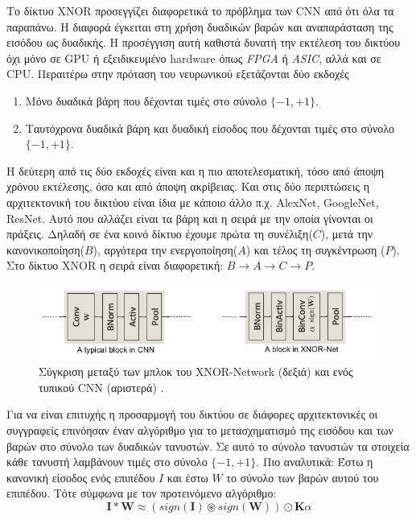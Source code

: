 Το δίκτυο XNOR προσεγγίζει διαφορετικά το πρόβλημα των CNN από ότι όλα τα παραπάνω. Η διαφορά έγκειται στη χρήση δυαδικών βαρών και αναπαράσταση της εισόδου ως δυαδικής. Η προσέγγιση αυτή καθιστά δυνατή την εκτέλεση του δικτύου όχι μόνο σε GPU ή εξειδικευμένο hardware όπως \textit{FPGA} ή \textit{ASIC}, αλλά και σε CPU. Περαιτέρω στην πρόταση του νευρωνικού εξετάζονται δύο εκδοχές
\begin{enumerate}
  \item Μόνο δυαδικά βάρη που δέχονται τιμές στο σύνολο $\{-1, +1\}$.
  \item Ταυτόχρονα δυαδικά βάρη και δυαδική είσοδος που δέχονται τιμές στο σύνολο $\{-1, +1\}$.
\end{enumerate}
Η δεύτερη από τις δύο εκδοχές είναι και η πιο αποτελεσματική, τόσο από άποψη χρόνου εκτέλεσης, όσο και από άποψη ακρίβειας. Και στις δύο περιπτώσεις η αρχιτεκτονική του δικτύου είναι ίδια με κάποιο άλλο π.χ. AlexNet\cite{20}, GoogleNet\cite{17}, ResNet\cite{21}. Αυτό που αλλάζει είναι τα βάρη και η σειρά με την οποία γίνονται οι πράξεις. Δηλαδή σε ένα κοινό δίκτυο έχουμε πρώτα τη συνέλιξη($C$), μετά την κανονικοποίηση($B$), αργότερα την ενεργοποίηση($A$) και τέλος τη συγκέντρωση ($P$). Στο δίκτυο XNOR η σειρά είναι διαφορετική: $B\rightarrow A\rightarrow C\rightarrow P$.

\begin{figure}
\centering
\includegraphics[width = \textwidth]{figures/XNOR_Net/XNOR_NET_block.png}
\caption[XNOR block vs typical CNN block]{Σύγκριση μεταξύ των μπλοκ του XNOR-Network (δεξιά) και ενός τυπικού CNN (αριστερά) \cite{18}.}
\label{fig:XNOR_NET_block}
\end{figure}

Για να είναι επιτυχής η προσαρμογή του δικτύου σε διάφορες αρχιτεκτονικές οι συγγραφείς επινόησαν έναν αλγόριθμο για το μετασχηματισμό της εισόδου και των βαρών στο σύνολο των δυαδικών τανυστών. Σε αυτό το σύνολο τανυστών τα στοιχεία κάθε τανυστή λαμβάνουν τιμές στο σύνολο $\{-1, +1\}$. Πιο αναλυτικά: Έστω η κανονική είσοδος ενός επιπέδου $I$ και έστω $W$ το σύνολο των βαρών αυτού του επιπέδου. Τότε σύμφωνα με τον προτεινόμενο αλγόριθμο:
    $$ \mathbf{I} \ast \mathbf{W} \approx (sign(\mathbf{I}) \circledast sign(\mathbf{W}) ) \odot \mathbf{K} \alpha  $$

